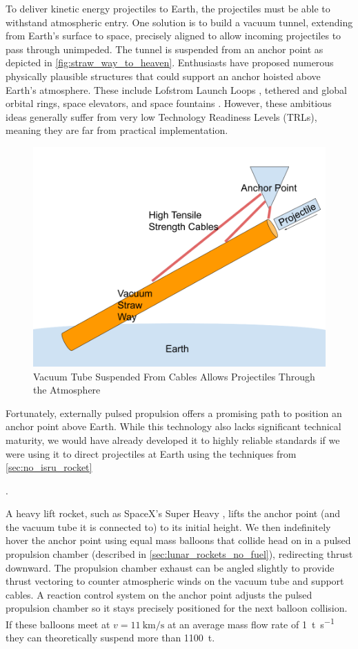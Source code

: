 \documentclass{article}
\begin{document}
{To deliver kinetic energy projectiles to Earth, the projectiles must be able to withstand atmospheric entry.  One solution is to build a vacuum tunnel, extending from Earth's surface to space, precisely aligned to allow incoming projectiles to pass through unimpeded.  The tunnel is suspended from an anchor point as depicted in \autoref{fig:straw_way_to_heaven}.   Enthusiasts have proposed numerous physically plausible structures that could support an anchor hoisted above Earth's atmosphere. These include Lofstrom Launch Loops \cite {lofstrom_loop}, tethered and global orbital rings, space elevators, and space fountains \cite{isaac_arthur_megastructure_complation}.  However, these ambitious ideas generally suffer from very low Technology Readiness Levels (TRLs), meaning they are far from practical implementation.

\begin{figure}[htpb]
    \centering
    \includegraphics[width=0.5\linewidth]{images/Straw Way To Heaven.png}
    \caption{Vacuum Tube Suspended From Cables Allows Projectiles Through the Atmosphere}
    \label{fig:straw_way_to_heaven}
\end{figure}


Fortunately, externally pulsed propulsion offers a promising path to position an anchor point above Earth. While this technology also lacks significant technical maturity, we would have already developed it to highly reliable standards if we were using it to direct projectiles at Earth using the techniques from \autoref{sec:no_isru_rocket}}.  

A heavy lift rocket, such as SpaceX's Super Heavy \cite{spacex_super_heavy}, lifts the anchor point (and the vacuum tube it is connected to) to its initial height.  We then indefinitely hover the anchor point using equal mass balloons that collide head on in a pulsed propulsion chamber (described in \autoref{sec:lunar_rockets_no_fuel}), redirecting thrust downward. The propulsion chamber exhaust can be angled slightly to provide thrust vectoring to counter atmospheric winds on the vacuum tube and support cables.  A reaction control system on the anchor point adjusts the pulsed propulsion chamber so it stays precisely positioned for the next balloon collision.  If these balloons meet at $v=\SI{11}{\kilo\meter\per\second}$ at an average mass flow rate of \SI{1}{\tonne\per\second} they can theoretically suspend more than \SI{1100}{\tonne}.   
\end{document}
